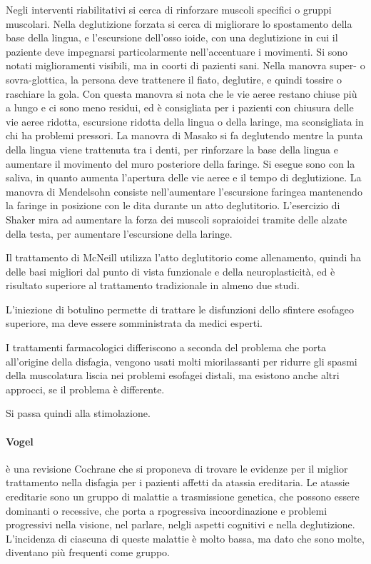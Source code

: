 Negli interventi riabilitativi si cerca di rinforzare muscoli specifici o 
gruppi muscolari.
Nella deglutizione forzata si cerca di migliorare lo spostamento della base 
della lingua, e l'escursione dell'osso ioide, con una deglutizione in cui il 
paziente deve impegnarsi particolarmente nell'accentuare i movimenti.
Si sono notati miglioramenti visibili, ma in coorti di pazienti sani.
Nella manovra super- o sovra-glottica, la persona deve trattenere il fiato, 
deglutire, e quindi tossire o raschiare la gola.
Con questa manovra si nota che le vie aeree restano chiuse più a lungo e ci 
sono meno residui, ed è consigliata per i pazienti con chiusura delle vie aeree 
ridotta, escursione ridotta della lingua o della laringe, ma sconsigliata in 
chi ha problemi pressori.
La manovra di Masako si fa deglutendo mentre la punta della lingua viene 
trattenuta tra i denti, per rinforzare la base della lingua e aumentare il 
movimento del muro posteriore della faringe.
Si esegue sono con la saliva, in quanto aumenta l'apertura delle vie aeree e il 
tempo di deglutizione.
La manovra di Mendelsohn consiste nell'aumentare l'escursione faringea 
mantenendo la faringe in posizione con le dita durante un atto deglutitorio.
L'esercizio di Shaker mira ad aumentare la forza dei muscoli sopraioidei 
tramite delle alzate della testa, per aumentare l'escursione della laringe.

Il trattamento di McNeill utilizza l'atto deglutitorio come allenamento, quindi 
ha delle basi migliori dal punto di vista funzionale e della neuroplasticità, 
ed è risultato superiore al trattamento tradizionale in almeno due studi.

L'iniezione di botulino permette di trattare le disfunzioni dello sfintere 
esofageo superiore, ma deve essere somministrata da medici esperti.

I trattamenti farmacologici differiscono a seconda del problema che porta 
all'origine della disfagia, vengono usati molti miorilassanti per ridurre gli 
spasmi della muscolatura liscia nei problemi esofagei distali, ma esistono 
anche altri approcci, se il problema è differente.

Si passa quindi alla stimolazione.

\paragraph{Vogel} \label{par:vog} \cite{Vogel2015} è una revisione Cochrane che 
si proponeva di trovare le evidenze per il miglior trattamento nella disfagia 
per i pazienti affetti da atassia ereditaria.
Le atassie ereditarie sono un gruppo di malattie a trasmissione genetica, che 
possono essere dominanti o recessive, che porta a rpogressiva incoordinazione e 
problemi progressivi nella visione, nel parlare, nelgli aspetti cognitivi e 
nella deglutizione.
L'incidenza di ciascuna di queste malattie è molto bassa, ma dato che sono 
molte, diventano più frequenti come gruppo.


